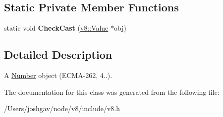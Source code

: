 \subsection*{Static Private Member Functions}
\begin{DoxyCompactItemize}
\item 
static void {\bfseries Check\+Cast} (\hyperlink{classv8_1_1_value}{v8\+::\+Value} $\ast$obj)\hypertarget{classv8_1_1_number_object_a07cdd9c9e54d63844cfeb651b975d753}{}\label{classv8_1_1_number_object_a07cdd9c9e54d63844cfeb651b975d753}

\end{DoxyCompactItemize}


\subsection{Detailed Description}
A \hyperlink{classv8_1_1_number}{Number} object (E\+C\+M\+A-\/262, 4..). 

The documentation for this class was generated from the following file\+:\begin{DoxyCompactItemize}
\item 
/\+Users/joshgav/node/v8/include/v8.\+h\end{DoxyCompactItemize}
